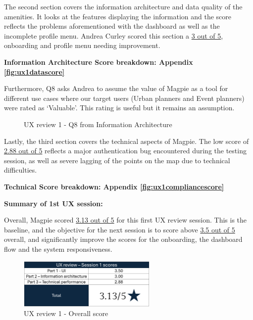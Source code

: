The second section covers the information architecture and data quality of the
amenities. It looks at the features displaying the information and the score
reflects the problems aforementioned with the dashboard as well as the
incomplete profile menu. Andrea Curley scored this section a \underline{3 out of 5},
onboarding and profile menu needing improvement.

\hspace{2em}\textbf{Information Architecture Score breakdown: Appendix
    \ref{fig:ux1datascore}}

Furthermore, Q8 asks Andrea to assume the value of Magpie as a tool for
different use cases where our target users (Urban planners and Event planners)
were rated as `Valuable'. This rating is useful but it remains an assumption.
\begin{figure}[h!]
    \centering
    \caption{UX review 1 - Q8 from Information Architecture}
\end{figure}

\newpage{}

Lastly, the third section covers the technical aspects of Magpie. The low score
of \underline{2.88 out of 5} reflects a major authentication bug encountered
during the testing session, as well as severe lagging of the points on the map
due to technical difficulties.

\hspace{2em}\textbf{Technical Score breakdown: Appendix
    \ref{fig:ux1compliancescore}}

\textbf{Summary of 1st UX session: }

\noindent Overall, Magpie scored \underline{3.13 out of 5} for this first UX
review session. This is the baseline, and the objective for the next session is
to score above \underline{3.5 out of 5} overall, and significantly improve the
scores for the onboarding, the dashboard flow and the system responsiveness.
\begin{figure}[h!]
    \centering
    \includegraphics[width=0.6\textwidth]{images/ux-survey1-summary.png}
    \caption{UX review 1 - Overall score}
\end{figure}

